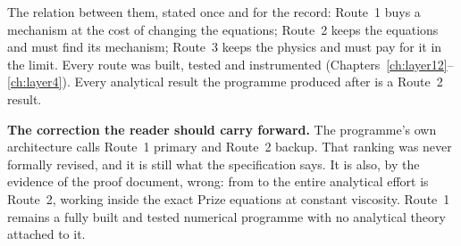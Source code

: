The relation between them, stated once and for the record: Route~1 buys a
mechanism at the cost of changing the equations; Route~2 keeps the equations
and must find its mechanism; Route~3 keeps the physics and must pay for it in
the limit. Every route was built, tested and instrumented
(Chapters~\ref{ch:layer12}--\ref{ch:layer4}). Every analytical result the
programme produced after  is a Route~2 result.

\begin{record}
\textbf{The correction the reader should carry forward.} The programme's own
architecture calls Route~1 primary and Route~2 backup. That ranking was
never formally revised, and it is still what the specification says. It is
also, by the evidence of the proof document, wrong: from  to 
the entire analytical effort is Route~2, working inside the exact Prize
equations at constant viscosity. Route~1 remains a fully built and tested
numerical programme with no analytical theory attached to it.
\end{record}
